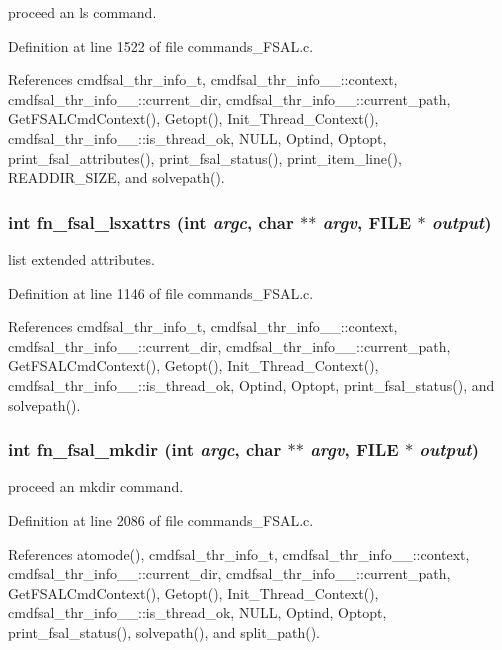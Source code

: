 proceed an ls command. 

Definition at line 1522 of file commands\_\-FSAL.c.

References cmdfsal\_\-thr\_\-info\_\-t, cmdfsal\_\-thr\_\-info\_\-\_\-::context, cmdfsal\_\-thr\_\-info\_\-\_\-::current\_\-dir, cmdfsal\_\-thr\_\-info\_\-\_\-::current\_\-path, Get\-FSALCmd\-Context(), Getopt(), Init\_\-Thread\_\-Context(), cmdfsal\_\-thr\_\-info\_\-\_\-::is\_\-thread\_\-ok, NULL, Optind, Optopt, print\_\-fsal\_\-attributes(), print\_\-fsal\_\-status(), print\_\-item\_\-line(), READDIR\_\-SIZE, and solvepath().
\subsubsection{\setlength{\rightskip}{0pt plus 5cm}int fn\_\-fsal\_\-lsxattrs (int {\em argc}, char $\ast$$\ast$ {\em argv}, FILE $\ast$ {\em output})}\label{commands__FSAL_8c_a22}


list extended attributes. 

Definition at line 1146 of file commands\_\-FSAL.c.

References cmdfsal\_\-thr\_\-info\_\-t, cmdfsal\_\-thr\_\-info\_\-\_\-::context, cmdfsal\_\-thr\_\-info\_\-\_\-::current\_\-dir, cmdfsal\_\-thr\_\-info\_\-\_\-::current\_\-path, Get\-FSALCmd\-Context(), Getopt(), Init\_\-Thread\_\-Context(), cmdfsal\_\-thr\_\-info\_\-\_\-::is\_\-thread\_\-ok, Optind, Optopt, print\_\-fsal\_\-status(), and solvepath().
\subsubsection{\setlength{\rightskip}{0pt plus 5cm}int fn\_\-fsal\_\-mkdir (int {\em argc}, char $\ast$$\ast$ {\em argv}, FILE $\ast$ {\em output})}\label{commands__FSAL_8c_a28}


proceed an mkdir command. 

Definition at line 2086 of file commands\_\-FSAL.c.

References atomode(), cmdfsal\_\-thr\_\-info\_\-t, cmdfsal\_\-thr\_\-info\_\-\_\-::context, cmdfsal\_\-thr\_\-info\_\-\_\-::current\_\-dir, cmdfsal\_\-thr\_\-info\_\-\_\-::current\_\-path, Get\-FSALCmd\-Context(), Getopt(), Init\_\-Thread\_\-Context(), cmdfsal\_\-thr\_\-info\_\-\_\-::is\_\-thread\_\-ok, NULL, Optind, Optopt, print\_\-fsal\_\-status(), solvepath(), and split\_\-path().
